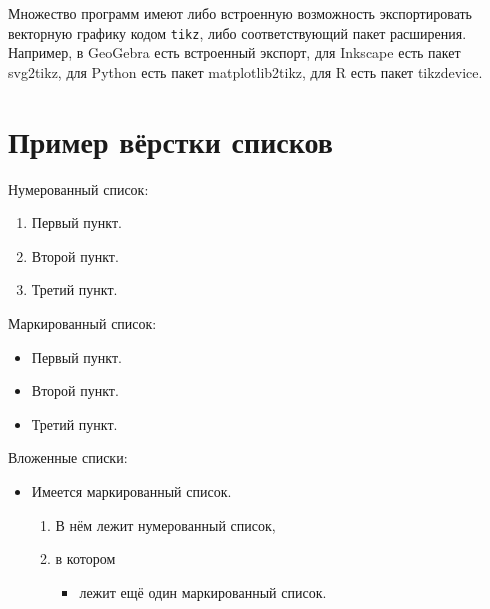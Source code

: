 Множество программ имеют либо встроенную возможность экспортировать векторную
графику кодом \verb|tikz|, либо соответствующий пакет расширения.
Например, в GeoGebra есть встроенный экспорт,
для Inkscape есть пакет svg2tikz,
для Python есть пакет matplotlib2tikz,
для R есть пакет tikzdevice.

\section{Пример вёрстки списков} \label{sec:ch2/sec3}

\noindent Нумерованный список:
\begin{enumerate}
	\item Первый пункт.
	\item Второй пункт.
	\item Третий пункт.
\end{enumerate}

\noindent Маркированный список:
\begin{itemize}
	\item Первый пункт.
	\item Второй пункт.
	\item Третий пункт.
\end{itemize}

\noindent Вложенные списки:
\begin{itemize}
	\item Имеется маркированный список.
	\begin{enumerate}
		\item В нём лежит нумерованный список,
		\item в котором
		\begin{itemize}
			\item лежит ещё один маркированный список.
		\end{itemize}
	\end{enumerate}
\end{itemize}

